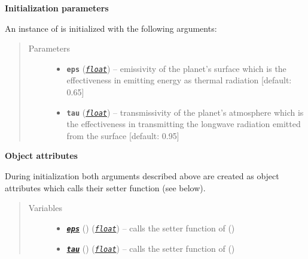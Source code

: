 \documentclass[a4paper,10pt,english]{sphinxmanual}
\begin{document}
\begin{fulllineitems}
\textbf{Initialization parameters}

An instance of  is initialized with the following 
arguments:
\begin{quote}\begin{description}
\item[{Parameters}] \leavevmode\begin{itemize}
\item {} 
\textbf{\texttt{eps}} (\href{http://docs.python.org/2.7/library/functions.html\#float}{\emph{\texttt{float}}}) -- emissivity of the planet's surface which is the
effectiveness in emitting energy as thermal radiation
{[}default: 0.65{]}

\item {} 
\textbf{\texttt{tau}} (\href{http://docs.python.org/2.7/library/functions.html\#float}{\emph{\texttt{float}}}) -- transmissivity of the planet's atmosphere which is the 
effectiveness in transmitting the longwave radiation
emitted from the surface {[}default: 0.95{]}

\end{itemize}

\end{description}\end{quote}

\textbf{Object attributes}

During initialization both arguments described above are created as object 
attributes which calls their setter function (see below).
\begin{quote}\begin{description}
\item[{Variables}] \leavevmode\begin{itemize}
\item {} 
{\hyperref[api/climlab.radiation:climlab.radiation.Boltzmann.Boltzmann.eps]{\emph{\textbf{\texttt{eps}}}}} () (\href{http://docs.python.org/2.7/library/functions.html\#float}{\emph{\texttt{float}}}) -- calls the setter function of {\hyperref[api/climlab.radiation:climlab.radiation.Boltzmann.Boltzmann.eps]{\emph{}}} ()

\item {} 
{\hyperref[api/climlab.radiation:climlab.radiation.Boltzmann.Boltzmann.tau]{\emph{\textbf{\texttt{tau}}}}} () (\href{http://docs.python.org/2.7/library/functions.html\#float}{\emph{\texttt{float}}}) -- calls the setter function of {\hyperref[api/climlab.radiation:climlab.radiation.Boltzmann.Boltzmann.tau]{\emph{}}} ()


\end{itemize}
\end{description}
\end{quote}
\end{fulllineitems}
\end{document}
